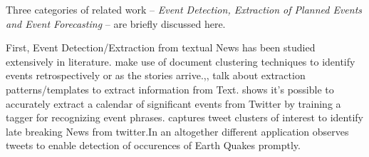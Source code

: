 Three categories of related work -- \emph{Event Detection, Extraction of Planned Events and  Event Forecasting} -- are briefly discussed here.

First, Event Detection/Extraction from textual News has been studied extensively in literature. \cite{Allan:2002:TDT} \cite{Yang:1998:SRO}\cite{Gabrilovich:2004:NPP} make use of document clustering techniques to identify events retrospectively or as the stories arrive.\cite{Chambers:2011:TIE},\cite{Banko07openinformation}, \cite{Riloff:2003:LEP} talk about extraction patterns/templates to extract information from Text. \cite{Ritter:2012} shows it's possible to accurately extract a calendar of significant events from Twitter by training a tagger for recognizing event phrases.\cite{Sankaranarayanan:2009:TNT} captures tweet clusters of interest to identify late breaking News from twitter.In an altogether different application \cite{Sakaki:2010:EST} observes tweets to enable detection of occurences of Earth Quakes promptly.

